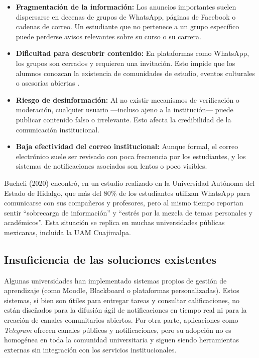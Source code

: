 \begin{itemize}[leftmargin=*]
    \item \textbf{Fragmentación de la información:} Los anuncios importantes suelen dispersarse en decenas de grupos de WhatsApp, páginas de Facebook o cadenas de correo. Un estudiante que no pertenece a un grupo específico puede perderse avisos relevantes sobre su curso o su carrera.
    \item \textbf{Dificultad para descubrir contenido:} En plataformas como WhatsApp, los grupos son cerrados y requieren una invitación. Esto impide que los alumnos conozcan la existencia de comunidades de estudio, eventos culturales o asesorías abiertas \cite{bucheli2020whatsapp}.
    \item \textbf{Riesgo de desinformación:} Al no existir mecanismos de verificación o moderación, cualquier usuario —incluso ajeno a la institución— puede publicar contenido falso o irrelevante. Esto afecta la credibilidad de la comunicación institucional.
    \item \textbf{Baja efectividad del correo institucional:} Aunque formal, el correo electrónico suele ser revisado con poca frecuencia por los estudiantes, y los sistemas de notificaciones asociados son lentos o poco visibles.
\end{itemize}

Bucheli (2020) encontró, en un estudio realizado en la Universidad Autónoma del Estado de Hidalgo, que más del 80\% de los estudiantes utilizan WhatsApp para comunicarse con sus compañeros y profesores, pero al mismo tiempo reportan sentir “sobrecarga de información” y “estrés por la mezcla de temas personales y académicos”. Esta situación se replica en muchas universidades públicas mexicanas, incluida la UAM Cuajimalpa.

\subsection{Insuficiencia de las soluciones existentes}

Algunas universidades han implementado sistemas propios de gestión de aprendizaje (como Moodle, Blackboard o plataformas personalizadas). Estos sistemas, si bien son útiles para entregar tareas y consultar calificaciones, no están diseñados para la difusión ágil de notificaciones en tiempo real ni para la creación de canales comunitarios abiertos. Por otra parte, aplicaciones como \textit{Telegram} ofrecen canales públicos y notificaciones, pero su adopción no es homogénea en toda la comunidad universitaria y siguen siendo herramientas externas sin integración con los servicios institucionales.

